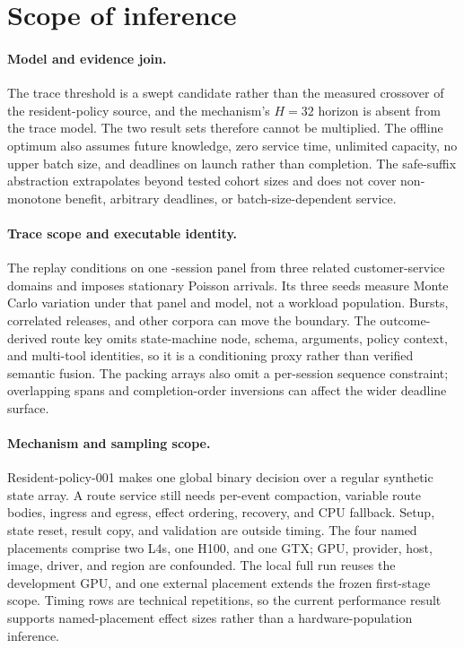 \section{Scope of inference}
\label{sec:limitations}

\paragraph{Model and evidence join.}
The trace threshold is a swept candidate rather than the measured crossover of
the resident-policy source, and the mechanism's $H=32$ horizon is absent from
the trace model. The two result sets therefore cannot be multiplied. The
offline optimum also assumes future knowledge, zero service time, unlimited
capacity, no upper batch size, and deadlines on launch rather than completion.
The safe-suffix abstraction extrapolates beyond tested cohort sizes and does
not cover non-monotone benefit, arbitrary deadlines, or batch-size-dependent
service.

\paragraph{Trace scope and executable identity.}
The replay conditions on one \TraceSessions-session panel from three related
customer-service domains and imposes stationary Poisson arrivals. Its three
seeds measure Monte Carlo variation under that panel and model, not a workload
population. Bursts, correlated releases, and other corpora can move the
boundary. The outcome-derived route key omits state-machine node, schema,
arguments, policy context, and multi-tool identities, so it is a conditioning
proxy rather than verified semantic fusion. The packing arrays also omit a
per-session sequence constraint; overlapping spans and completion-order
inversions can affect the wider deadline surface.

\paragraph{Mechanism and sampling scope.}
Resident-policy-001 makes one global binary decision over a regular synthetic
state array. A route service still needs per-event compaction, variable route
bodies, ingress and egress, effect ordering, recovery, and CPU fallback. Setup,
state reset, result copy, and validation are outside timing. The four named
placements comprise two L4s, one H100, and one GTX; GPU, provider, host, image,
driver, and region are confounded. The local full run reuses the development
GPU, and one external placement extends the frozen first-stage scope. Timing
rows are technical repetitions, so the current performance result supports
named-placement effect sizes rather than a hardware-population inference.

